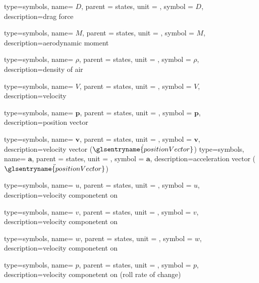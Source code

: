 {type=symbols,
  name= \ensuremath{D},
  parent = {states},
  unit = \unexpanded{\si{\newton}},
  symbol = \ensuremath{D},
  description={drag force}
}

{type=symbols,
  name= \ensuremath{M},
  parent = {states},
  unit = \unexpanded{\si{\newton\meter}},
  symbol = \ensuremath{M},
  description={aerodynamic moment}
}

{type=symbols,
  name= \ensuremath{\rho},
  parent = {states},
  unit = \unexpanded{\si{\kilogram\per\meter\cubed}},
  symbol = \ensuremath{\rho},
  description={density of air}
}

{type=symbols,
  name= \ensuremath{V},
  parent = {states},
  unit = \unexpanded{\si{\meter\per\second}},
  symbol = \ensuremath{V},
  description={velocity}
}

{type=symbols,
  name= \ensuremath{\mathbf{p}},
  parent = {states},
  unit = \unexpanded{\si{\meter}},
  symbol = \ensuremath{\mathbf{p}},
  description={position vector}
}

{type=symbols,
  name= \ensuremath{\mathbf{v}},
  parent = {states},
  unit = \unexpanded{\si{\meter\per\second}},
  symbol = \ensuremath{\mathbf{v}},
  description={velocity vector ($\dot{\glsentryname{positionVector}}$)}
}
{type=symbols,
  name= \ensuremath{\mathbf{a}},
  parent = {states},
  unit = \unexpanded{\si{\meter\per\second\squared}},
  symbol = \ensuremath{\mathbf{a}},
  description={acceleration vector ($\ddot{\glsentryname{positionVector}}$)}
}


{type=symbols,
  name= \ensuremath{u},
  parent = {states},
  unit = \unexpanded{\si{\meter\per\second}},
  symbol = \ensuremath{u},
  description={velocity componetent on }
}

{type=symbols,
  name= \ensuremath{v},
  parent = {states},
  unit = \unexpanded{\si{\meter\per\second}},
  symbol = \ensuremath{v},
  description={velocity componetent on }
}

{type=symbols,
  name= \ensuremath{w},
  parent = {states},
  unit = \unexpanded{\si{\meter\per\second}},
  symbol = \ensuremath{w},
  description={velocity componetent on }
}

{type=symbols,
  name= \ensuremath{p},
  parent = {states},
  unit = \unexpanded{\si{\radian\per\second}},
  symbol = \ensuremath{p},
  description={velocity componetent on  (roll rate of change)}
}

